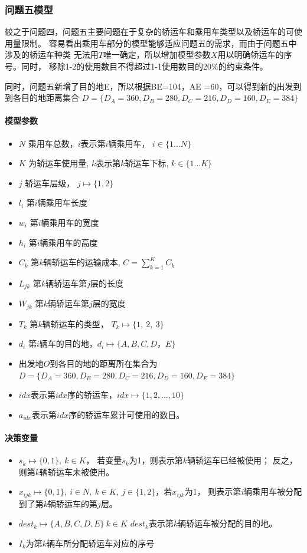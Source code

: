 \documentclass[UTF8，12pt]{ctexart}
\begin{document}
\subsubsection{问题五模型}
较之于问题四，问题五主要问题在于复杂的轿运车和乘用车类型以及轿运车的可使用量限制。
容易看出乘用车部分的模型能够适应问题五的需求，而由于问题五中涉及的轿运车种类 
无法用$T$唯一确定，所以增加模型参数$X$用以明确轿运车的序号。同时，
移除1-2的使用数目不得超过1-1使用数目的20\%的约束条件。

同时，问题五新增了目的地E，所以根据BE=104，AE =60，可以得到新的出发到到各目的地距离集合
$D=\{D_A=360, D_B=280, D_C=216, D_D=160, D_E=384 \}$
\paragraph{模型参数}
	\begin{itemize}
			\item $N$ 乘用车总数，$i$表示第$i$辆乘用车， $i \in \{1 \dots N\}$
			\item $K$ 为轿运车使用量, $k$表示第$k$轿运车下标,  $k \in \{1 \dots K\}$
			\item $j$ 轿运车层级， $j \mapsto \{1,2\}$
			\item $l_i$ 第$i$辆乘用车长度
			\item $w_i$ 第$i$辆乘用车的宽度
			\item $h_i$ 第$i$辆乘用车的高度
			\item $C_k$ 第$k$辆轿运车的运输成本, $C=\sum_{k=1}^{K}C_k$
			\item $L_{jk}$ 第$k$辆轿运车第$j$层的长度
			\item $W_{jk}$ 第$k$辆轿运车第$j$层的宽度
			\item $T_k$ 第$k$辆轿运车的类型， $T_k \mapsto \{1, ~2, ~3\}$
			\item $d_i$ 第$i$辆车的目的地，$d_i \mapsto \{A, B, C, D， E\}$		
			\item 出发地$O$到各目的地的距离所在集合为 $D=\{D_A=360, D_B=280, D_C=216, D_D=160, D_E=384 \}$
			\item $idx$表示第$idx$序的轿运车，$idx \mapsto \{1,2, \dots, 10\}$
			\item $a_{idx}$表示第$idx$序的轿运车累计可使用的数目。
		\end{itemize}

\paragraph{决策变量}
	\begin{itemize}
		\item $s_k \mapsto \{0,1\}, ~ k \in K$， 若变量$s_k$为1，则表示第$k$辆轿运车已经被使用；
		反之，则第$k$辆轿运车未被使用。
		\item $x_{ijk}\mapsto \{0,1\}, ~ i\in N,~ k \in K,~ j\in \{1,2\}$，若$x_{ijk}$为1，
		则表示第$i$辆乘用车被分配到了第$k$辆轿运车的第$j$层。
		\item $dest_k \mapsto \{A,B,C,D,E\}  ~ k \in K$ $dest_k$表示第$k$辆轿运车被分配的目的地。
		\item $I_k$为第$k$辆车所分配轿运车对应的序号
	\end{itemize}
\end{document}
